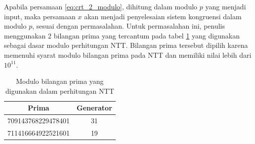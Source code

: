 Apabila persamaan \eqref{eq:crt_2_modulo}, dihitung dalam modulo $ p $ yang menjadi input, maka persamaan $ x $ akan menjadi penyelesaian sistem kongruensi dalam modulo $ p $, sesuai dengan permasalahan. Untuk permasalahan ini, penulis menggunakan 2 bilangan prima yang tercantum pada tabel \ref{tab:two_primes} yang digunakan sebagai dasar modulo perhitungan NTT. Bilangan prima tersebut dipilih karena memenuhi syarat modulo bilangan prima pada NTT dan memiliki nilai lebih dari $ 10^{11} $.

\begin{table}[]
	\Centering
	\begin{tabular}{|c|c|}
	\hline
	Prima              & Generator \\ \hline
	709143768229478401 & 31        \\ \hline
	711416664922521601 & 19        \\ \hline
	\end{tabular}
	\caption{Modulo bilangan prima yang digunakan dalam perhitungan NTT}
	\label{tab:two_primes}
\end{table}
